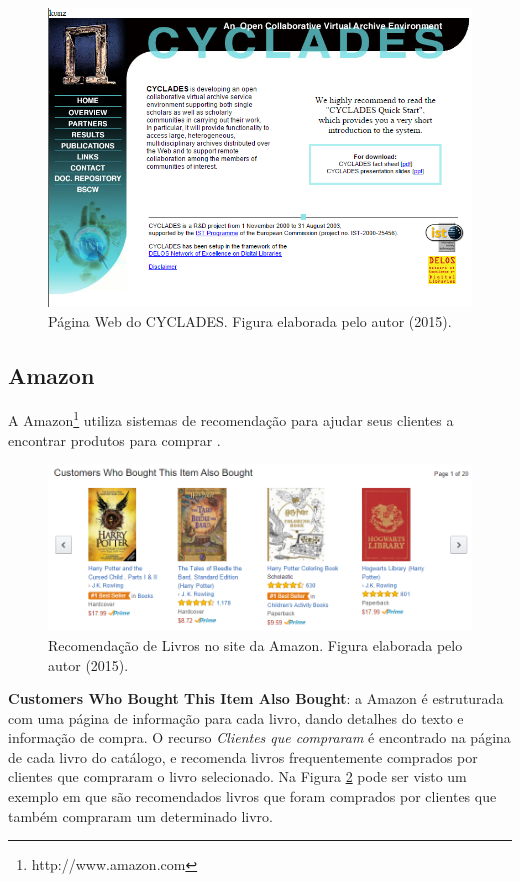 \begin{figure}
	\centering
	\includegraphics[scale=0.65]{imagens/cyclades.png}
	\caption{Página Web do CYCLADES. Figura elaborada pelo autor (2015).}
	\label{fig:cyclades}
\end{figure} 


\subsection{Amazon}

A Amazon\footnote{http://www.amazon.com} utiliza sistemas de recomendação para ajudar seus clientes a encontrar produtos para comprar \citep{Schafer:1999:RSE:336992.337035}.

\begin{figure}
	\centering
	\includegraphics[scale=0.65]{imagens/amazon.png}
	\caption{Recomendação de Livros no site da Amazon. Figura elaborada pelo autor (2015).}
	\label{fig:amazon}
\end{figure} 

\textbf{Customers Who Bought This Item Also Bought}: a Amazon é estruturada com uma página de informação para cada livro, dando detalhes do texto e informação de compra. O recurso \textit{Clientes que compraram} é encontrado na página de cada livro do catálogo, e recomenda livros frequentemente comprados por clientes que compraram o livro selecionado. Na Figura \ref{fig:amazon} pode ser visto um exemplo em que são recomendados livros que foram comprados por clientes que também compraram um determinado livro.

